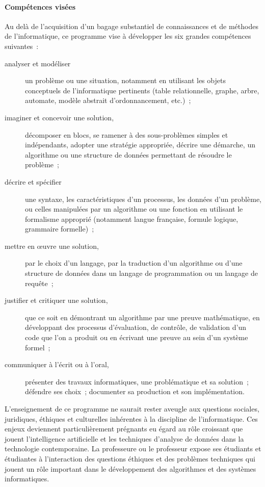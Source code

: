 \paragraph{Compétences visées} Au delà de l'acquisition d'un bagage substantiel de connaissances et de méthodes de l'informatique, ce programme vise à développer les six grandes compétences suivantes~:
\begin{description}
\item[analyser et modéliser] un problème ou une situation, notamment en utilisant les objets conceptuels de l'informatique pertinents (table relationnelle, graphe, arbre, automate, modèle abstrait d'ordonnancement, etc.)~;
\item[imaginer et concevoir une solution,] décomposer en blocs, se ramener à des sous-problèmes simples et indépendants, adopter une stratégie appropriée, décrire une démarche, un algorithme ou une structure de données permettant de résoudre le problème~;
\item[décrire et spécifier] une syntaxe, les caractéristiques d'un processus, les données d'un problème, ou celles manipulées par un algorithme ou une fonction en utilisant le formalisme approprié (notamment langue française, formule logique, grammaire formelle)~;
\item[mettre en \oe uvre une solution,] par le choix d'un langage, par la traduction d'un algorithme ou d'une structure de données dans un langage de programmation ou un langage de requête~;
\item[justifier et critiquer une solution,] que ce soit en démontrant un algorithme par une preuve mathématique, en développant des processus d'évaluation, de contrôle, de validation d'un code que l'on a produit ou en écrivant une preuve au sein d'un système formel~;
\item[communiquer à l'écrit ou à l'oral,] présenter des travaux informatiques, une problématique et sa solution~; défendre ses choix~; documenter sa production et son implémentation. 
\end{description}

L'enseignement de ce programme ne saurait rester aveugle aux questions sociales, juridiques, éthiques et culturelles inhérentes à la discipline de l'informatique. Ces enjeux deviennent particulièrement prégnants eu égard au rôle croissant que jouent l'intelligence artificielle et les techniques d'analyse de données dans la technologie contemporaine. La professeure ou le professeur expose ses étudiants et étudiantes à l'interaction des questions éthiques et des problèmes techniques qui jouent un rôle important dans le développement des algorithmes et des systèmes informatiques.


